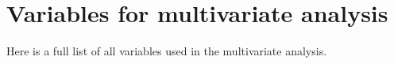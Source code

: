 \documentclass[a4paper,11pt]{article}
\begin{document}



\appendix
\section{Variables for multivariate analysis}

Here is a full list of all variables used in the multivariate analysis.
\end{document}
